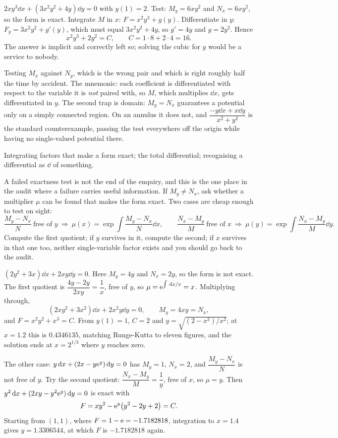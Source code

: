 \begin{worked}
$2xy^{3}\dd x+(3x^{2}y^{2}+4y)\dd y=0$ with $y(1)=2$. Test: $M_y=6xy^{2}$ and $N_x=6xy^{2}$, so the form is exact. Integrate $M$ in $x$: $F=x^{2}y^{3}+g(y)$. Differentiate in $y$: $F_y=3x^{2}y^{2}+g'(y)$, which must equal $3x^{2}y^{2}+4y$, so $g'=4y$ and $g=2y^{2}$. Hence
\[x^{2}y^{3}+2y^{2}=C,\qquad C=1\cdot8+2\cdot4=16.\]
The answer is implicit and correctly left so; solving the cubic for $y$ would be a service to nobody.
\end{worked}

\begin{trap}
Testing $M_x$ against $N_y$, which is the wrong pair and which is right roughly half the time by accident. The mnemonic: each coefficient is differentiated with respect to the variable it is \emph{not} paired with, so $M$, which multiplies $\dd x$, gets differentiated in $y$. The second trap is domain: $M_y=N_x$ guarantees a potential only on a simply connected region. On an annulus it does not, and $\dfrac{-y\dd x+x\dd y}{x^{2}+y^{2}}$ is the standard counterexample, passing the test everywhere off the origin while having no single-valued potential there.
\end{trap}

\begin{seealsob}Integrating factors that make a form exact; the total differential; recognising a differential as $\dd$ of something.\end{seealsob}

A failed exactness test is not the end of the enquiry, and this is the one place in the audit where a failure carries useful information. If $M_y\neq N_x$, ask whether a multiplier $\mu$ can be found that makes the form exact. Two cases are cheap enough to test on sight:
\[\frac{M_y-N_x}{N}\ \text{free of }y\ \Longrightarrow\ \mu(x)=\exp\!\int\frac{M_y-N_x}{N}\dd x,\qquad \frac{N_x-M_y}{M}\ \text{free of }x\ \Longrightarrow\ \mu(y)=\exp\!\int\frac{N_x-M_y}{M}\dd y.\]
Compute the first quotient; if $y$ survives in it, compute the second; if $x$ survives in that one too, neither single-variable factor exists and you should go back to the audit.

\begin{worked}
$(2y^{2}+3x)\dd x+2xy\dd y=0$. Here $M_y=4y$ and $N_x=2y$, so the form is not exact. The first quotient is $\dfrac{4y-2y}{2xy}=\dfrac1x$, free of $y$, so $\mu=\mathrm{e}^{\int\,\mathrm{d} x/x}=x$. Multiplying through,
\[(2xy^{2}+3x^{2})\dd x+2x^{2}y\dd y=0,\qquad M_y=4xy=N_x,\]
and $F=x^{2}y^{2}+x^{3}=C$. From $y(1)=1$, $C=2$ and $y=\sqrt{(2-x^{3})/x^{2}}$; at $x=1.2$ this is $0.4346135$, matching Runge-Kutta to eleven figures, and the solution ends at $x=2^{1/3}$ where $y$ reaches zero.

The other case: $y\,\mathrm{d} x+(2x-y\mathrm{e}^{y})\,\mathrm{d} y=0$ has $M_y=1$, $N_x=2$, and $\dfrac{M_y-N_x}{N}$ is not free of $y$. Try the second quotient: $\dfrac{N_x-M_y}{M}=\dfrac1y$, free of $x$, so $\mu=y$. Then $y^{2}\,\mathrm{d} x+(2xy-y^{2}\mathrm{e}^{y})\,\mathrm{d} y=0$ is exact with
\[F=xy^{2}-\mathrm{e}^{y}\bigl(y^{2}-2y+2\bigr)=C.\]
Starting from $(1,1)$, where $F=1-\mathrm{e}=-1.7182818$, integration to $x=1.4$ gives $y=1.3306544$, at which $F$ is $-1.7182818$ again.
\end{worked}

